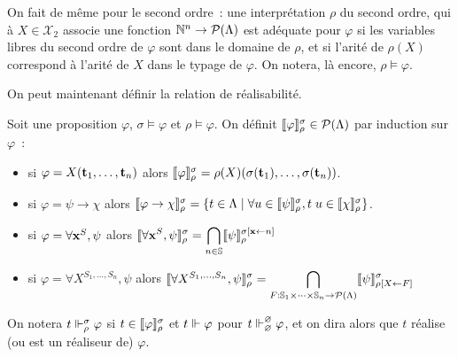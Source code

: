\documentclass{article}
\begin{document}
On fait de même pour le second ordre~: une interprétation $\rho$ du second ordre, qui à $X \in \mathcal X_2$ associe une fonction $\mathbb{N}^n \to \mathcal P(\Lambda)$ est adéquate pour $\varphi$ si les variables libres du second ordre de $\varphi$ sont dans le domaine de $\rho$, et si l'arité de $\rho(X)$ correspond à l'arité de $X$ dans le typage de $\varphi$. On notera, là encore, $\rho\models \varphi$.

On peut maintenant définir la relation de réalisabilité.

\begin{defi}
    Soit une proposition $\varphi$, $\sigma\models \varphi$ et $\rho\models \varphi$. On définit $\llbracket \varphi \rrbracket_\rho^\sigma \in \mathcal P(\Lambda)$ par induction sur $\varphi$~:
    \begin{itemize}
        \item si $\varphi = X(\mathbf{t}_1,\ldots,\mathbf{t}_n)$ alors $\llbracket \varphi \rrbracket_\rho^\sigma = \rho(X)(\sigma(\mathbf{t}_1),\ldots,\sigma(\mathbf{t}_n))$.
        \item si $\varphi = \psi \to \chi$ alors $\llbracket \varphi\to\chi \rrbracket_\rho^\sigma = \{t \in \Lambda\mid \forall u \in \llbracket \psi \rrbracket_\rho^\sigma, t\;u \in \llbracket \chi \rrbracket_\rho^\sigma\}$.
        \item si $\varphi = \forall \mathbf{x}^S, \psi$ alors $\displaystyle\llbracket \forall \mathbf{x}^S, \psi \rrbracket_\rho^\sigma = \bigcap_{n \in \mathbb{S}} \llbracket \psi \rrbracket_\rho^{\sigma[\mathbf{x}\leftarrow n]}$
        \item si $\varphi = \forall X^{S_1,\ldots,S_n}, \psi$ alors $\displaystyle\llbracket \forall X^{S_1,\ldots,S_n},\psi \rrbracket_\rho^\sigma = \bigcap_{F : \mathbb{S}_1\times\cdots\times\mathbb{S}_n \to \mathcal P(\Lambda)} \llbracket \psi \rrbracket_{\rho[X\leftarrow F]}^\sigma$
    \end{itemize}

    On notera $t\Vdash_\rho^\sigma \varphi$ si $t\in\llbracket \varphi \rrbracket_\rho^\sigma$ et $t\Vdash\varphi$ pour $t\Vdash_\varnothing^\varnothing\varphi$, et on dira alors que $t$ réalise (ou est un réaliseur de) $\varphi$.
\end{defi}
\end{document}

